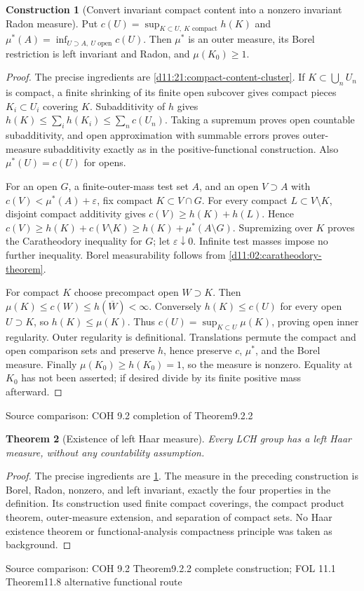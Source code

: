 \documentclass[11pt,oneside,openany]{book}
\newtheorem{theorem}{Theorem}[chapter]
\theoremstyle{definition}
\newtheorem{construction}[theorem]{Construction}
\theoremstyle{remark}
\newcommand{\eps}{\varepsilon}\newcommand{\ee}{\varepsilon}
\newcommand{\family}[1]{}
\newcommand{\source}[1]{\par\begingroup\small\sffamily\color{black!65}Source comparison: #1\par\endgroup}
\begin{document}
\begin{construction}[Convert invariant compact content into a nonzero invariant Radon measure]\family{D11.21.compact_content_radon_measure}\label{d11:21:compact-content-radon-measure}
Put $c(U)=\sup_{K\subset U,\ K\text{ compact}}h(K)$ and $\mu^*(A)=\inf_{U\supset A,\ U\text{ open}}c(U)$. Then $\mu^*$ is an outer measure, its Borel restriction is left invariant and Radon, and $\mu(K_0)\ge1$.
\end{construction}
\begin{proof}
The precise ingredients are \cref{d11:21:compact-content-cluster}. If $K\subset\bigcup_nU_n$ is compact, a finite shrinking of its finite open subcover gives compact pieces $K_i\subset U_i$ covering $K$. Subadditivity of $h$ gives $h(K)\le\sum_i h(K_i)\le\sum_n c(U_n)$. Taking a supremum proves open countable subadditivity, and open approximation with summable errors proves outer-measure subadditivity exactly as in the positive-functional construction. Also $\mu^*(U)=c(U)$ for opens.

For an open $G$, a finite-outer-mass test set $A$, and an open $V\supset A$ with $c(V)<\mu^*(A)+\eps$, fix compact $K\subset V\cap G$. For every compact $L\subset V\setminus K$, disjoint compact additivity gives $c(V)\ge h(K)+h(L)$. Hence $c(V)\ge h(K)+c(V\setminus K)\ge h(K)+\mu^*(A\setminus G)$. Supremizing over $K$ proves the Caratheodory inequality for $G$; let $\eps\downarrow0$. Infinite test masses impose no further inequality. Borel measurability follows from \cref{d11:02:caratheodory-theorem}.

For compact $K$ choose precompact open $W\supset K$. Then $\mu(K)\le c(W)\le h(\overline W)<\infty$. Conversely $h(K)\le c(U)$ for every open $U\supset K$, so $h(K)\le\mu(K)$. Thus $c(U)=\sup_{K\subset U}\mu(K)$, proving open inner regularity. Outer regularity is definitional. Translations permute the compact and open comparison sets and preserve $h$, hence preserve $c$, $\mu^*$, and the Borel measure. Finally $\mu(K_0)\ge h(K_0)=1$, so the measure is nonzero. Equality at $K_0$ has not been asserted; if desired divide by its finite positive mass afterward.
\end{proof}
\source{COH 9.2 completion of Theorem9.2.2}

\begin{theorem}[Existence of left Haar measure]\family{D11.21.haar_existence}\label{d11:21:haar-existence}
Every LCH group has a left Haar measure, without any countability assumption.
\end{theorem}
\begin{proof}
The precise ingredients are \cref{d11:21:compact-content-radon-measure}. The measure in the preceding construction is Borel, Radon, nonzero, and left invariant, exactly the four properties in the definition. Its construction used finite compact coverings, the compact product theorem, outer-measure extension, and separation of compact sets. No Haar existence theorem or functional-analysis compactness principle was taken as background.
\end{proof}
\source{COH 9.2 Theorem9.2.2 complete construction; FOL 11.1 Theorem11.8 alternative functional route}
\end{document}
